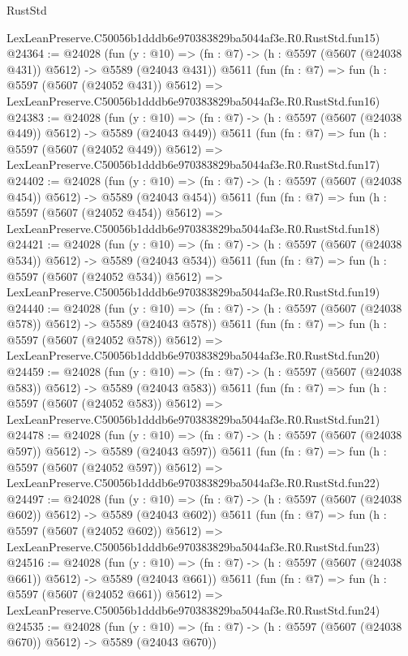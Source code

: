 \begin{lexlean}{RustStd}
\begin{coremodule}
    LexLeanPreserve.C50056b1dddb6e970383829ba5044af3e.R0.RustStd.fun15)
@24364 := @24028
    (fun (y : @10) => (fn : @7) -> (h : @5597 (@5607 (@24038 @431)) @5612) -> @5589 (@24043 @431))
    @5611
    (fun (fn : @7) =>
    fun (h : @5597 (@5607 (@24052 @431)) @5612) =>
    LexLeanPreserve.C50056b1dddb6e970383829ba5044af3e.R0.RustStd.fun16)
@24383 := @24028
    (fun (y : @10) => (fn : @7) -> (h : @5597 (@5607 (@24038 @449)) @5612) -> @5589 (@24043 @449))
    @5611
    (fun (fn : @7) =>
    fun (h : @5597 (@5607 (@24052 @449)) @5612) =>
    LexLeanPreserve.C50056b1dddb6e970383829ba5044af3e.R0.RustStd.fun17)
@24402 := @24028
    (fun (y : @10) => (fn : @7) -> (h : @5597 (@5607 (@24038 @454)) @5612) -> @5589 (@24043 @454))
    @5611
    (fun (fn : @7) =>
    fun (h : @5597 (@5607 (@24052 @454)) @5612) =>
    LexLeanPreserve.C50056b1dddb6e970383829ba5044af3e.R0.RustStd.fun18)
@24421 := @24028
    (fun (y : @10) => (fn : @7) -> (h : @5597 (@5607 (@24038 @534)) @5612) -> @5589 (@24043 @534))
    @5611
    (fun (fn : @7) =>
    fun (h : @5597 (@5607 (@24052 @534)) @5612) =>
    LexLeanPreserve.C50056b1dddb6e970383829ba5044af3e.R0.RustStd.fun19)
@24440 := @24028
    (fun (y : @10) => (fn : @7) -> (h : @5597 (@5607 (@24038 @578)) @5612) -> @5589 (@24043 @578))
    @5611
    (fun (fn : @7) =>
    fun (h : @5597 (@5607 (@24052 @578)) @5612) =>
    LexLeanPreserve.C50056b1dddb6e970383829ba5044af3e.R0.RustStd.fun20)
@24459 := @24028
    (fun (y : @10) => (fn : @7) -> (h : @5597 (@5607 (@24038 @583)) @5612) -> @5589 (@24043 @583))
    @5611
    (fun (fn : @7) =>
    fun (h : @5597 (@5607 (@24052 @583)) @5612) =>
    LexLeanPreserve.C50056b1dddb6e970383829ba5044af3e.R0.RustStd.fun21)
@24478 := @24028
    (fun (y : @10) => (fn : @7) -> (h : @5597 (@5607 (@24038 @597)) @5612) -> @5589 (@24043 @597))
    @5611
    (fun (fn : @7) =>
    fun (h : @5597 (@5607 (@24052 @597)) @5612) =>
    LexLeanPreserve.C50056b1dddb6e970383829ba5044af3e.R0.RustStd.fun22)
@24497 := @24028
    (fun (y : @10) => (fn : @7) -> (h : @5597 (@5607 (@24038 @602)) @5612) -> @5589 (@24043 @602))
    @5611
    (fun (fn : @7) =>
    fun (h : @5597 (@5607 (@24052 @602)) @5612) =>
    LexLeanPreserve.C50056b1dddb6e970383829ba5044af3e.R0.RustStd.fun23)
@24516 := @24028
    (fun (y : @10) => (fn : @7) -> (h : @5597 (@5607 (@24038 @661)) @5612) -> @5589 (@24043 @661))
    @5611
    (fun (fn : @7) =>
    fun (h : @5597 (@5607 (@24052 @661)) @5612) =>
    LexLeanPreserve.C50056b1dddb6e970383829ba5044af3e.R0.RustStd.fun24)
@24535 := @24028
    (fun (y : @10) => (fn : @7) -> (h : @5597 (@5607 (@24038 @670)) @5612) -> @5589 (@24043 @670))

\end{coremodule}
\end{lexlean}
